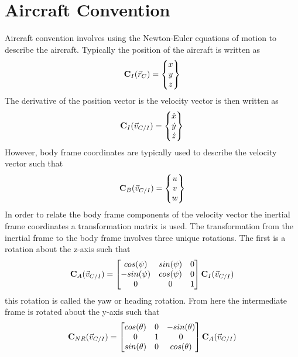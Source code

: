 \documentclass{article}
\begin{document}
\section{Aircraft Convention}
Aircraft convention involves using the Newton-Euler equations of
motion to describe the aircraft\cite{etkins}. Typically the position of the
aircraft is written as 
\begin{equation}
{\bf C}_I(\vec{r}_C) = \begin{Bmatrix} x \\ y \\ z \end{Bmatrix}
\end{equation}
The derivative of the position vector is the velocity vector is then
written as
\begin{equation}
{\bf C}_I(\vec{v}_{C/I}) = \begin{Bmatrix} \dot{x} \\ \dot{y} \\ \dot{z} \end{Bmatrix}
\end{equation}
However, body frame coordinates are typically used to
describe the velocity vector such that
\begin{equation}
{\bf C}_B(\vec{v}_{C/I}) = \begin{Bmatrix} u \\ v \\ w \end{Bmatrix}
\end{equation}
In order to relate the body frame components of the velocity vector
the inertial frame coordinates a transformation matrix is used. The
transformation from the inertial frame to the body frame involves
three unique rotations. The first is a rotation about the z-axis such
that
\begin{equation}
{\bf C}_A(\vec{v}_{C/I}) = \begin{bmatrix} cos(\psi) & sin(\psi) & 0
  \\ -sin(\psi) & cos(\psi) & 0 \\ 0 & 0 & 1 \end{bmatrix} {\bf C}_I(\vec{v}_{C/I})
\end{equation}
this rotation is called the yaw or heading rotation. From here the
intermediate frame is rotated about the y-axis such that
\begin{equation}
{\bf C}_{NR}(\vec{v}_{C/I}) = \begin{bmatrix} cos(\theta) & 0 &
  -sin(\theta) \\ 0 & 1 & 0 \\ sin(\theta) & 0 & cos(\theta) \end{bmatrix} {\bf C}_A(\vec{v}_{C/I})
\end{equation}
\end{document}
